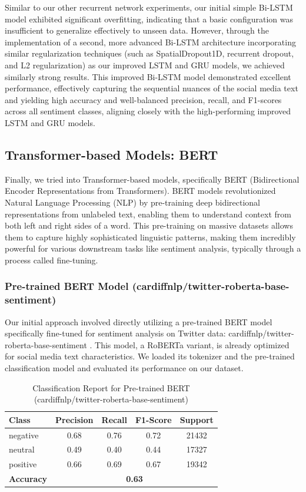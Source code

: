 Similar to our other recurrent network experiments, our initial simple Bi-LSTM model exhibited significant overfitting, indicating that a basic configuration was insufficient to generalize effectively to unseen data. However, through the implementation of a second, more advanced Bi-LSTM architecture incorporating similar regularization techniques (such as SpatialDropout1D, recurrent dropout, and L2 regularization) as our improved LSTM and GRU models, we achieved similarly strong results. This improved Bi-LSTM model demonstrated excellent performance, effectively capturing the sequential nuances of the social media text and yielding high accuracy and well-balanced precision, recall, and F1-scores across all sentiment classes, aligning closely with the high-performing improved LSTM and GRU models.

\subsection{Transformer-based Models: BERT}

Finally, we tried into Transformer-based models, specifically BERT (Bidirectional Encoder Representations from Transformers). BERT models revolutionized Natural Language Processing (NLP) by pre-training deep bidirectional representations from unlabeled text, enabling them to understand context from both left and right sides of a word. This pre-training on massive datasets allows them to capture highly sophisticated linguistic patterns, making them incredibly powerful for various downstream tasks like sentiment analysis, typically through a process called fine-tuning.

\subsubsection{\textbf{Pre-trained BERT Model (cardiffnlp/twitter-roberta-base-sentiment)}}

Our initial approach involved directly utilizing a pre-trained BERT model specifically fine-tuned for sentiment analysis on Twitter data: cardiffnlp/twitter-roberta-base-sentiment \cite{camacho-collados-etal-2022-tweetnlp}. This model, a RoBERTa variant, is already optimized for social media text characteristics. We loaded its tokenizer and the pre-trained classification model and evaluated its performance on our dataset.

\begin{table}[H]
\centering
\caption{Classification Report for Pre-trained BERT (cardiffnlp/twitter-roberta-base-sentiment)}
\begin{tabular}{|l|c|c|c|c|}
\hline
\textbf{Class} & \textbf{Precision} & \textbf{Recall} & \textbf{F1-Score} & \textbf{Support} \\
\hline
negative & 0.68 & 0.76 & 0.72 & 21432 \\
neutral & 0.49 & 0.40 & 0.44 & 17327 \\
positive & 0.66 & 0.69 & 0.67 & 19342 \\
\hline
\textbf{Accuracy} & \multicolumn{4}{|c|}{\textbf{0.63}} \\
\hline
\end{tabular}
\label{tab:pretrained_bert_report}
\end{table}

